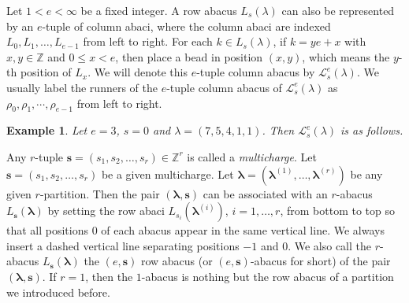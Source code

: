 \documentclass[a4paper,10pt]{amsart}
\theoremstyle{plain}
\newcommand{\lam}{\lambda}
\def\bs{{\boldsymbol{s}}}
\def\blam{{\boldsymbol \lambda}}
\theoremstyle{plain}
\newtheorem{example}[theorem]{Example}
\numberwithin{equation}{section}
\begin{document}
Let $1<e<\infty$ be a fixed integer. A row abacus $L_s(\lam)$ can also be represented by an $e$-tuple of column abaci, where the column abaci are indexed \(L_0, L_1, \dots, L_{e-1}\) from left to right. For each $k\in L_s(\lam)$, if $k=ye+x$ with $x, y\in\mathbb{Z}$ and $0\leq x<e$, then place a bead in position $(x, y)$, which means the $y$-th position of $L_x$. We will denote this $e$-tuple column abacus by $\mathcal{L}_s^e(\lam)$. We usually label the runners of the $e$-tuple column abacus of $\mathcal{L}_s^e(\lam)$ as $\rho_0,\rho_1,\cdots,\rho_{e-1}$ from left to right.

\begin{example}
Let $e=3$,  $s=0$ and $\lambda=(7, 5, 4 ,1, 1)$. Then $\mathcal{L}_s^e(\lam)$ is as follows.
\begin{center}
	\end{center}
\end{example}



Any $r$-tuple $\bs=(s_1, s_2, \dots, s_r)\in \mathbb{Z}^r$ is called a \emph{multicharge}. Let $\bs=(s_1, s_2, \dots, s_r)$ be a given multicharge. Let $\blam=(\blam^{(1)}, \dots, \blam^{(r)})$ be any given $r$-partition.
Then the pair $(\blam, \bs)$ can be associated with an $r$-abacus $L_\bs(\blam)$ by setting the row abaci $L_{s_i}(\blam^{(i)})$, $i=1, \dots, r$, from bottom to top so that all positions $0$ of each abacus appear in the same vertical line.  We always insert a dashed vertical line separating positions \(-1\) and $0$. We also call the $r$-abacus $L_{\bs}(\blam)$ the $(e,\bs)$ row abacus (or $(e,\bs)$-abacus for short) of the pair $(\blam, \bs)$. If $r=1$, then the $1$-abacus is nothing but the row abacus of a partition we introduced before.
\end{document}
